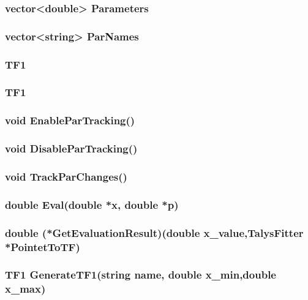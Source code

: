 \documentclass[a4paper,12pt]{extarticle}
\begin{document}
\subsubsection{vector<double> Parameters}
\subsubsection{vector<string> ParNames}
\subsubsection{TF1}
\subsubsection{TF1}
\subsubsection{void EnableParTracking()}
\subsubsection{void DisableParTracking()}
\subsubsection{void TrackParChanges()}
\subsubsection{double Eval(double *x, double *p)}
\subsubsection{double (*GetEvaluationResult)(double x_value,TalysFitter *PointetToTF)}
\subsubsection{TF1 GenerateTF1(string name, double x_min,double x_max)}
\end{document}
